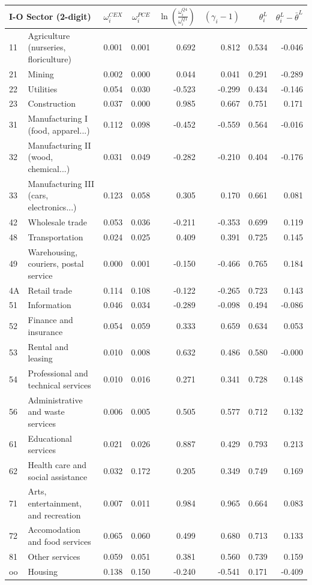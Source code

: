 \begin{tabular}{llrrrrrr} \toprule 
\multicolumn{2}{l}{I-O Sector (2-digit)} & $\omega_i^{CEX}$ & 
$\omega_i^{PCE}$ & $\ln\left( \frac{\omega_i^{Q4}}{\omega_i^{Q1}} \right)$ & $(\gamma_i-1)$ & $\theta^L_i$ & $\theta^L_i-\bar\theta^L$
\\ \midrule
11&Agriculture (nurseries, floriculture)&0.001&0.001&0.692&0.812&0.534&-0.046\\
21&Mining&0.002&0.000&0.044&0.041&0.291&-0.289\\
22&Utilities&0.054&0.030&-0.523&-0.299&0.434&-0.146\\
23&Construction&0.037&0.000&0.985&0.667&0.751&0.171\\
31&Manufacturing I (food, apparel...)&0.112&0.098&-0.452&-0.559&0.564&-0.016\\
32&Manufacturing II (wood, chemical...)&0.031&0.049&-0.282&-0.210&0.404&-0.176\\
33&Manufacturing III (cars, electronics...) &0.123&0.058&0.305&0.170&0.661&0.081\\
42&Wholesale trade&0.053&0.036&-0.211&-0.353&0.699&0.119\\
48&Transportation&0.024&0.025&0.409&0.391&0.725&0.145\\
49&Warehousing, couriers, postal service&0.000&0.001&-0.150&-0.466&0.765&0.184\\
4A&Retail trade&0.114&0.108&-0.122&-0.265&0.723&0.143\\
51&Information&0.046&0.034&-0.289&-0.098&0.494&-0.086\\
52&Finance and insurance&0.054&0.059&0.333&0.659&0.634&0.053\\
53&Rental and leasing&0.010&0.008&0.632&0.486&0.580&-0.000\\
54&Professional and technical services&0.010&0.016&0.271&0.341&0.728&0.148\\
56&Administrative and waste services&0.006&0.005&0.505&0.577&0.712&0.132\\
61&Educational services&0.021&0.026&0.887&0.429&0.793&0.213\\
62&Health care and social assistance&0.032&0.172&0.205&0.349&0.749&0.169\\
71&Arts, entertainment, and recreation &0.007&0.011&0.984&0.965&0.664&0.083\\
72&Accomodation and food services&0.065&0.060&0.499&0.680&0.713&0.133\\
81&Other services&0.059&0.051&0.381&0.560&0.739&0.159\\
oo&Housing&0.138&0.150&-0.240&-0.541&0.171&-0.409\\
\bottomrule \end{tabular}
